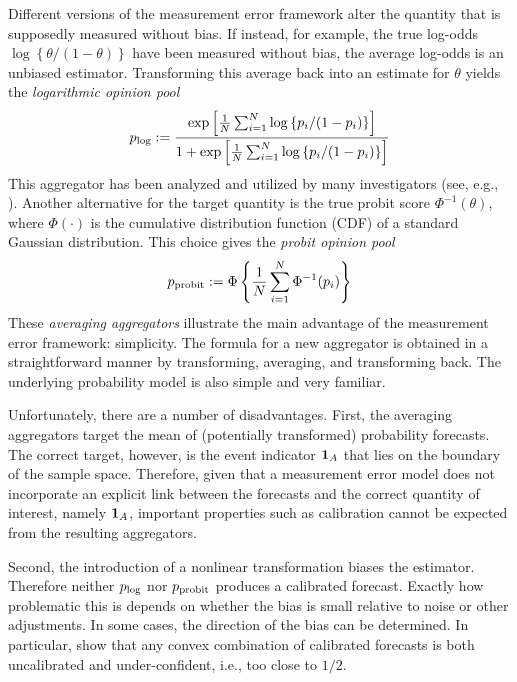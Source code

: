 \documentclass[11pt]{article}
\theoremstyle{definition}
\theoremstyle{definition}
\def\one{{\bf 1}}
\def\probit{p_{\rm probit}}
\def\plog{p_{\rm log}}
\begin{document}
Different versions of the measurement error framework alter the quantity that is supposedly
measured without bias. If instead, for example, the true log-odds
$\log\left\{\theta/(1-\theta)\right\}$ have been measured without
bias, the average log-odds is an unbiased estimator. Transforming
this average back into an estimate for $\theta$ yields the {\em
logarithmic opinion pool}
$$\plog := \frac{\exp \left [ \frac{1}{N} \sum_{i=1}^N
   \log \left\{ p_i / (1-p_i) \right\} \right ]} {1 + \exp \left [
\frac{1}{N} \sum_{i=1}^N \log \left\{p_i / (1-p_i)\right\} \right
]} $$ This aggregator has been analyzed and utilized by many
investigators (see, e.g., \citealt{dawid1995coherent, Genest,
bacharach1975group}). Another alternative for the target quantity is
the true probit score $\Phi^{-1}(\theta)$, where $\Phi(\cdot)$ is the
cumulative distribution function (CDF) of a standard Gaussian
distribution. This choice gives the {\em probit opinion pool}
$$\probit := \Phi \left\{ \frac{1}{N} \sum_{i=1}^N \Phi^{-1}
   (p_i) \right \} $$
These \textit{averaging aggregators} illustrate the main advantage of the measurement
error framework: simplicity.  The formula for a new aggregator is
obtained in a straightforward manner by transforming, averaging, and
transforming back.  The underlying probability model is also simple
and very familiar.  

Unfortunately, there are a number of disadvantages. First, the averaging aggregators target the mean of
(potentially transformed) probability forecasts. The correct target,
however, is the event indicator $\one_A$ that lies on the boundary of
the sample space. Therefore, given that a measurement error model does not incorporate an explicit link between the forecasts and the correct quantity of interest, namely $\one_A$, important properties such as calibration cannot be expected from the resulting aggregators. 


Second, the introduction of a nonlinear transformation biases the
estimator.  Therefore neither $\plog$ nor $\probit$ produces a
calibrated forecast. Exactly how problematic this is depends on
whether the bias is small relative to noise or other
adjustments. In some cases,  the direction of the bias can be determined. In particular, \citet{Ranjan08} show that any convex
combination of calibrated forecasts is both uncalibrated and under-confident, i.e.,
too close to $1/2$. 
\end{document}
